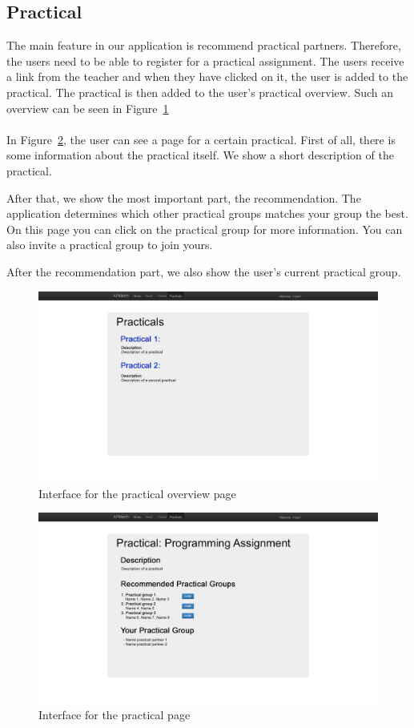 \subsection{Practical}
The main feature in our application is recommend practical partners.
Therefore, the users need to be able to register for a practical assignment.
The users receive a link from the teacher and when they have clicked on it, the user is added to the practical.
The practical is then added to the user's practical overview.
Such an overview can be seen in Figure~\ref{mockup_practical_overview}
\\\\
In Figure~\ref{mockup_practical}, the user can see a page for a certain practical.
First of all, there is some information about the practical itself.
We show a short description of the practical.

After that, we show the most important part, the recommendation.
The application determines which other practical groups matches your group the best.
On this page you can click on the practical group for more information.
You can also invite a practical group to join yours.

After the recommendation part, we also show the user's current practical group.


\begin{figure}[h]
    \centering
    \captionsetup{justification=centering}
    \includegraphics[width=\textwidth, frame]{images/mockup_practical_overview}
    \caption{Interface for the practical overview page}
    \label{mockup_practical_overview}
\end{figure}

\begin{figure}[h]
    \centering
    \captionsetup{justification=centering}
    \includegraphics[width=\textwidth, frame]{images/mockup_practical}
    \caption{Interface for the practical page}
    \label{mockup_practical}
\end{figure}
